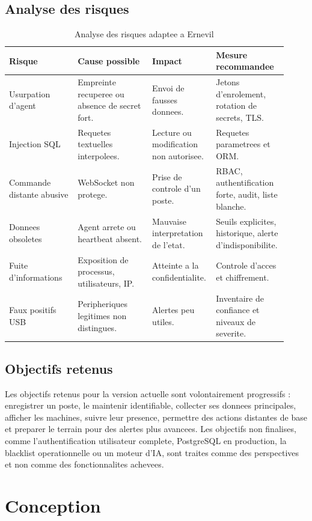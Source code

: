 \documentclass[12pt,a4paper]{report}
\begin{document}
\section{Analyse des risques}
\begin{longtable}{p{0.24\linewidth}p{0.26\linewidth}p{0.18\linewidth}p{0.24\linewidth}}
\caption{Analyse des risques adaptee a Ernevil}\\
\toprule
\textbf{Risque} & \textbf{Cause possible} & \textbf{Impact} & \textbf{Mesure recommandee}\\
\midrule
Usurpation d'agent & Empreinte recuperee ou absence de secret fort. & Envoi de fausses donnees. & Jetons d'enrolement, rotation de secrets, TLS.\\
Injection SQL & Requetes textuelles interpolees. & Lecture ou modification non autorisee. & Requetes parametrees et ORM.\\
Commande distante abusive & WebSocket non protege. & Prise de controle d'un poste. & RBAC, authentification forte, audit, liste blanche.\\
Donnees obsoletes & Agent arrete ou heartbeat absent. & Mauvaise interpretation de l'etat. & Seuils explicites, historique, alerte d'indisponibilite.\\
Fuite d'informations & Exposition de processus, utilisateurs, IP. & Atteinte a la confidentialite. & Controle d'acces et chiffrement.\\
Faux positifs USB & Peripheriques legitimes non distingues. & Alertes peu utiles. & Inventaire de confiance et niveaux de severite.\\
\bottomrule
\end{longtable}

\section{Objectifs retenus}
Les objectifs retenus pour la version actuelle sont volontairement progressifs : enregistrer un poste, le maintenir identifiable, collecter ses donnees principales, afficher les machines, suivre leur presence, permettre des actions distantes de base et preparer le terrain pour des alertes plus avancees. Les objectifs non finalises, comme l'authentification utilisateur complete, PostgreSQL en production, la blacklist operationnelle ou un moteur d'IA, sont traites comme des perspectives et non comme des fonctionnalites achevees.

\chapter{Conception}
\end{document}
